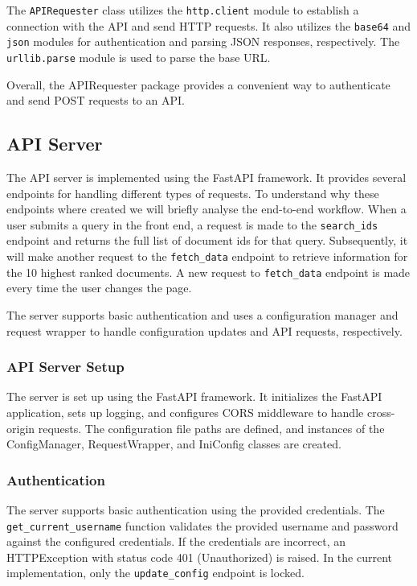 \documentclass{article}
\begin{document}
The \texttt{APIRequester} class utilizes the \texttt{http.client} module to establish a 
connection with the API and send HTTP requests. It also utilizes the \texttt{base64} and 
\texttt{json} modules for authentication and parsing JSON responses, respectively. 
The \texttt{urllib.parse} module is used to parse the base URL.

Overall, the APIRequester package provides a convenient way to authenticate and send POST 
requests to an API.  

\subsection{API Server}
\label{sec:apiserver}

The API server is implemented using the FastAPI framework. It provides several endpoints for 
handling different types of requests. To understand why these endpoints where created we will 
briefly analyse the end-to-end workflow. When a user submits a query in the front end, a request
is made to the \texttt{search\_ids} endpoint and returns the full list of document ids for that 
query. Subsequently, it will make another request to the \texttt{fetch\_data} endpoint to retrieve 
information for the 10 highest ranked documents. A new request to \texttt{fetch\_data} endpoint 
is made every time the user changes the page. 


The server supports basic authentication and uses a 
configuration manager and request wrapper to handle configuration updates and API requests, 
respectively.

\subsubsection{API Server Setup}

The server is set up using the FastAPI framework. It initializes the FastAPI application, sets 
up logging, and configures CORS middleware to handle cross-origin requests. The configuration 
file paths are defined, and instances of the ConfigManager, RequestWrapper, and IniConfig 
classes are created.

\subsubsection{Authentication}

The server supports basic authentication using the provided credentials. 
The \texttt{get\_current\_username} function validates the provided username and password 
against the configured credentials. If the credentials are incorrect, an HTTPException with 
status code 401 (Unauthorized) is raised. In the current implementation, only the 
\texttt{update\_config} endpoint is locked.
\end{document}
